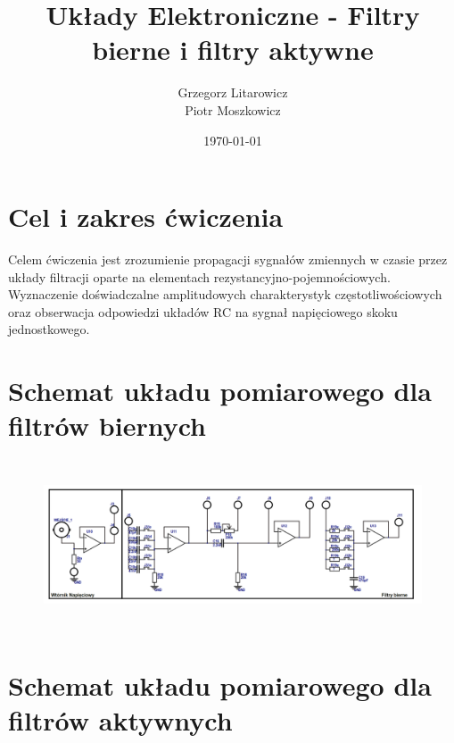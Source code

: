 \documentclass[a4paper,12pt]{article}
\begin{document}
\title{Układy Elektroniczne - Filtry bierne i filtry aktywne}
\author{Grzegorz Litarowicz \\ Piotr Moszkowicz} 
\date{\today}
\maketitle
{}

\newpage
\begin{justify}
\tableofcontents
\newpage
{}

\section{Cel i zakres ćwiczenia}

Celem ćwiczenia jest zrozumienie propagacji sygnałów zmiennych w czasie przez układy filtracji oparte na elementach rezystancyjno-pojemnościowych. Wyznaczenie doświadczalne amplitudowych charakterystyk częstotliwościowych oraz obserwacja odpowiedzi układów RC na sygnał napięciowego skoku jednostkowego. 

\section{Schemat układu pomiarowego dla filtrów biernych}

\begin{figure}[h]
\centering
\includegraphics[width=15cm, height=5cm]{schemat_bierne}
\end{figure}

\section{Schemat układu pomiarowego dla filtrów aktywnych}


\end{justify}
\end{document}
